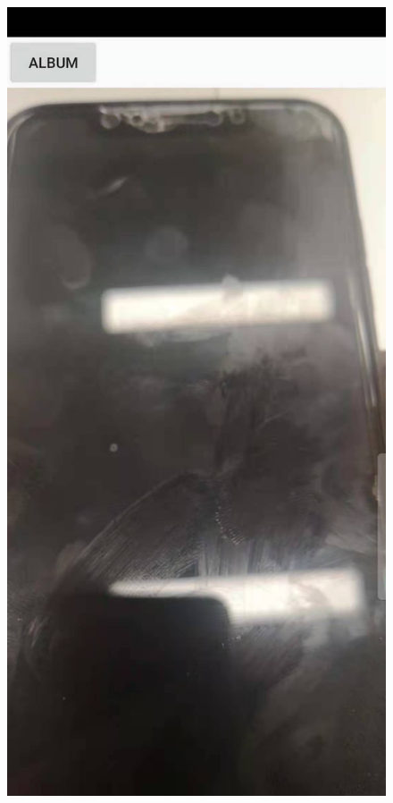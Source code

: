 \documentclass[12pt, a4paper]{article}
\theoremstyle{definition}
\begin{document}
\begin{figure}[htbp]
\begin{minipage}[t]{0.2\linewidth}
		\end{minipage}
	\linebreak
		\begin{minipage}[t]{0.2\linewidth}
		\centering
		\includegraphics[width=\linewidth]{6-4.jpeg}

\end{minipage}
\end{figure}
\end{document}
